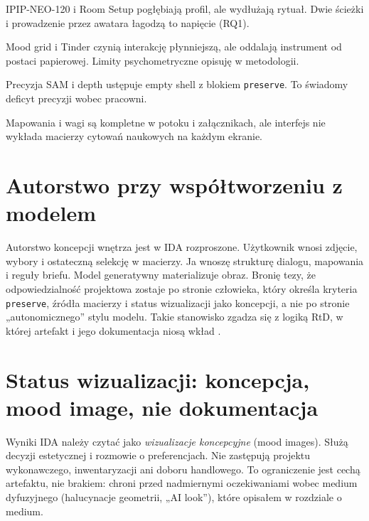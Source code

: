 \begin{description}[style=nextline]
  \item[Długość ścieżki pełnej a odpadanie uczestników]
    IPIP-NEO-120 i Room Setup pogłębiają profil, ale wydłużają rytuał. Dwie ścieżki i prowadzenie przez awatara łagodzą to napięcie (RQ1).
  \item[Wierność skali a przyjemność interakcji]
    Mood grid i Tinder czynią interakcję płynniejszą, ale oddalają instrument od postaci papierowej. Limity psychometryczne opisuję w metodologii.
  \item[Kontrola geometrii a prostota produktu]
    Precyzja SAM i depth ustępuje empty shell z blokiem \texttt{preserve}. To świadomy deficyt precyzji wobec pracowni.
  \item[Przejrzystość a złożoność interfejsu]
    Mapowania i wagi są kompletne w potoku i załącznikach, ale interfejs nie wykłada macierzy cytowań naukowych na każdym ekranie.
\end{description}

\section{Autorstwo przy współtworzeniu z modelem}
\label{ch07:sec:autorstwo}

Autorstwo koncepcji wnętrza jest w IDA rozproszone. Użytkownik wnosi zdjęcie, wybory i ostateczną selekcję w macierzy. Ja wnoszę strukturę dialogu, mapowania i reguły briefu. Model generatywny materializuje obraz.
Bronię tezy, że odpowiedzialność projektowa zostaje po stronie człowieka, który określa kryteria \texttt{preserve}, źródła macierzy i status wizualizacji jako koncepcji, a nie po stronie „autonomicznego” stylu modelu. Takie stanowisko zgadza się z logiką RtD, w której artefakt i jego dokumentacja niosą wkład \parencite{zimmerman2007rtd,frayling1993research}.

\section{Status wizualizacji: koncepcja, mood image, nie dokumentacja}
\label{ch07:sec:status-wizualizacji}

Wyniki IDA należy czytać jako \emph{wizualizacje koncepcyjne} (mood images). Służą decyzji estetycznej i rozmowie o preferencjach. Nie zastępują projektu wykonawczego, inwentaryzacji ani doboru handlowego. To ograniczenie jest cechą artefaktu, nie brakiem: chroni przed nadmiernymi oczekiwaniami wobec medium dyfuzyjnego (halucynacje geometrii, „AI look”), które opisałem w rozdziale o medium.

